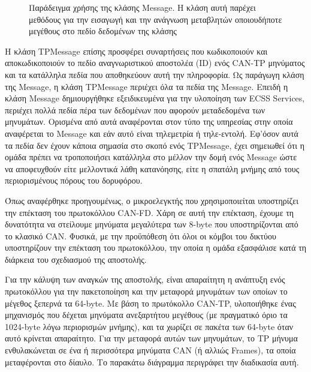 \documentclass[a4paper,nobib,justified]{tufte-book}
\begin{document}
\begin{figure}
	\inputminted{cpp}{code/examples/ecss-message-usage.cpp}
	\label{code:ecss-message-usage}
	\caption[Παράδειγμα χρήσης της κλάσης Message]{Παράδειγμα χρήσης της κλάσης Message. Η κλάση αυτή παρέχει μεθόδους για την εισαγωγή και την ανάγνωση μεταβλητών οποιουδήποτε μεγέθους στο πεδίο δεδομένων της κλάσης}
\end{figure}

Η κλάση TPMessage επίσης προσφέρει συναρτήσεις που κωδικοποιούν και αποκωδικοποιούν το πεδίο αναγνωριστικού αποστολέα (ID) ενός CAN-TP μηνύματος και τα κατάλληλα πεδία που αποθηκεύουν αυτή την πληροφορία. Ως παράγωγη κλάση της Message, η κλάση TPMessage περιέχει όλα τα πεδία της Message. Επειδή η κλάση Message δημιουργήθηκε εξειδικευμένα για την υλοποίηση των ECSS Services, περιέχει πολλά πεδία πέρα των δεδομένων που αφορούν μεταδεδομένα των μηνυμάτων. Ορισμένα από αυτά αναφέρονται στον τύπο της υπηρεσίας στην οποία αναφέρεται το Message και εάν αυτό είναι τηλεμετρία ή τηλε-εντολή. Εφ'όσον αυτά τα πεδία δεν έχουν κάποια σημασία στο σκοπό ενός TPMessage, έχει σημειωθεί ότι η ομάδα πρέπει να τροποποιήσει κατάλληλα στο μέλλον την δομή ενός Message ώστε να αποφευχθούν είτε μελλοντικά λάθη κατανόησης, είτε η σπατάλη μνήμης από τους περιορισμένους πόρους του δορυφόρου. 

Όπως αναφέρθηκε προηγουμένως, ο μικροελεγκτής που χρησιμοποιείται υποστηρίζει την επέκταση του πρωτοκόλλου CAN-FD. Χάρη σε αυτή την επέκταση, έχουμε τη δυνατότητα να στείλουμε μηνύματα μεγαλύτερα των 8-byte που υποστηρίζονται από το κλασικό CAN. Φυσικά, με την προϋπόθεση ότι όλοι οι κόμβοι του δικτύου υποστηρίζουν την επέκταση του πρωτοκόλλου, την οποία η ομάδα εξασφάλισε κατά τη διάρκεια του σχεδιασμού της αποστολής.

Για την κάλυψη των αναγκών της αποστολής, είναι απαραίτητη η ανάπτυξη ενός πρωτοκόλλου για την πακετοποίηση και την μεταφορά μηνυμάτων των οποίων το μέγεθος ξεπερνά τα 64-byte. Με βάση το πρωτόκολλο CAN-TP, υλοποιήθηκε ένας μηχανισμός που δέχεται μηνύματα ανεξαρτήτου μεγέθους (με πραγματικό όριο τα 1024-byte λόγω περιορισμών μνήμης), και τα χωρίζει σε πακέτα των 64-byte όταν αυτό κρίνεται απαραίτητο. Για την μεταφορά αυτών των μηνυμάτων, το TP μήνυμα ενθυλακώνεται σε ένα ή περισσότερα μηνύματα CAN (ή αλλιώς Frames), τα οποία μεταφέρονται στο δίαυλο. Το παρακάτω διάγραμμα περιγράφει την διαδικασία αυτή. 

\end{document}
